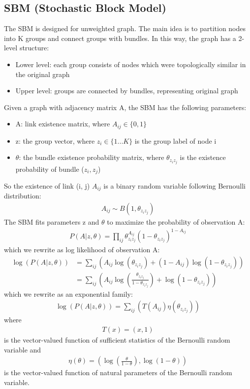 \documentclass[letterpaper]{article}
\begin{document}
\subsection{SBM (Stochastic Block Model)}
The SBM is designed for unweighted graph.
The main idea is to partition nodes into K groups and connect groups with bundles.
In this way, the graph has a 2-level structure:
\begin{itemize}
	\item Lower level: each group consists of nodes which were topologically similar in the original graph
	\item Upper level: groups are connected by bundles, representing original graph
\end{itemize}
Given a graph with adjacency matrix A, the SBM has the following parameters:
\begin{itemize}
	\item A: link existence matrix, where $ A_{ij} \in \{0, 1\} $
	\item z: the group vector,
	where $ z_i \in \{ 1 ... K \} $ is the group label of node i
	\item $ \theta $: the bundle existence probability matrix,
	where $ \theta_{z_i z_j} $ is the existence probability of bundle ($z_i, z_j$)
\end{itemize}
So the existence of link (i, j) $ A_{ij} $ is a binary random variable following Bernoulli distribution:
\begin{align*}
	A_{ij} \sim B(1, \theta_{z_i z_j})
\end{align*}
The SBM fits parameters z and $ \theta $
to maximize the probability of observation A:
\begin{align*}
	P(A|z, \theta) 
	= \prod_{ij} \theta_{z_i z_j}^{A_{ij}}(1-\theta_{z_i z_j})^{1-A_{ij}}
\end{align*}
which we rewrite as log likelihood of observation A:
\begin{align*}
	\log(P(A|z, \theta))
	&= \sum_{ij} (
	{A_{ij}} \log (\theta_{z_i z_j})
	+ (1 - {A_{ij}}) \log(1-\theta_{z_i z_j})
	)\\
	&= \sum_{ij} (
	{A_{ij}} \log (\frac{\theta_{z_i z_j}}{1-\theta_{z_i z_j}})
	+ \log(1-\theta_{z_i z_j})
	)
\end{align*}
which we rewrite as an exponential family:
\begin{align*}
	\log(P(A|z, \theta))
	= \sum_{ij} (
	T(A_{ij}) \eta(\theta_{z_i z_j})
	)
\end{align*}
where
\begin{align*}
	T(x) = (x, 1)
\end{align*}
is the vector-valued function of sufficient statistics of the Bernoulli random variable and
\begin{align*}
\eta(\theta) = ( \log(\frac{\theta}{1-\theta}), \log(1-\theta) )
\end{align*}
is the vector-valued function of natural parameters of the Bernoulli random variable.
\end{document}
